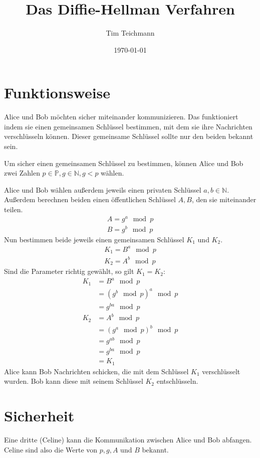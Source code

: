 \documentclass[twocolumn]{report}
\title{\textbf{Das Diffie-Hellman Verfahren}}
\author{Tim Teichmann}
\date{\today}
\begin{document}
\maketitle

\section*{Funktionsweise}
Alice und Bob möchten sicher miteinander kommunizieren.
Das funktioniert indem sie einen gemeinsamen Schlüssel bestimmen,
mit dem sie ihre Nachrichten verschlüsseln können. Dieser gemeinsame
Schlüssel sollte nur den beiden bekannt sein.

Um sicher einen gemeinsamen Schlüssel zu bestimmen, können Alice und Bob
zwei Zahlen $p\in\mathbb{P},g\in\mathbb{N},g<p$ wählen.

Alice und Bob wählen außerdem jeweils einen privaten Schlüssel $a,b\in\mathbb{N}$.
Außerdem berechnen beiden einen öffentlichen Schlüssel $A,B$, den sie miteinander teilen.
\begin{align}
    A=g^a \mod p \\
    B=g^b \mod p
\end{align}
Nun bestimmen beide jeweils einen gemeinsamen Schlüssel $K_1$ und $K_2$.
\begin{align}
    K_1=B^a \mod p \\
    K_2=A^b \mod p
\end{align}
Sind die Parameter richtig gewählt, so gilt $K_1=K_2$:
\begin{align}
    K_1&=B^a \mod p \\
    &=\left(g^b \mod p\right)^a \mod p \\
    &=g^{ba} \mod p \\
    K_2&=A^b \mod p \\
    &=\left(g^a \mod p\right)^b \mod p \\
    &=g^{ab} \mod p \\
    &=g^{ba} \mod p \\
    &=K_1
\end{align}
Alice kann Bob Nachrichten schicken, die mit dem Schlüssel $K_1$ verschlüsselt wurden.
Bob kann diese mit seinem Schlüssel $K_2$ entschlüsseln.

\section*{Sicherheit}
Eine dritte (Celine) kann die Kommunikation zwischen Alice und Bob abfangen.
Celine sind also die Werte von $p,g,A$ und $B$ bekannt.
\end{document}
